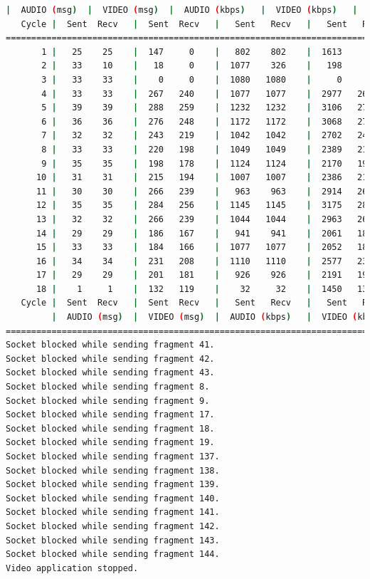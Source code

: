 \begin{lstlisting}[language=bash,basicstyle=\ttfamily\tiny]
         |  AUDIO (msg)  |  VIDEO (msg)  |  AUDIO (kbps)   |  VIDEO (kbps)   |     CPU (%) 
   Cycle |  Sent  Recv   |  Sent  Recv   |   Sent   Recv   |   Sent   Recv   | Program System
================================================================================================
       1 |   25    25    |  147     0    |   802    802    |  1613      0    |  22      0       
       2 |   33    10    |   18     0    |  1077    326    |   198      0    |  37     77       
       3 |   33    33    |    0     0    |  1080   1080    |     0      0    |  34     80       
       4 |   33    33    |  267   240    |  1077   1077    |  2977   2679    |  37     67       
       5 |   39    39    |  288   259    |  1232   1232    |  3106   2795    |  55     69       
       6 |   36    36    |  276   248    |  1172   1172    |  3068   2761    |  23     65
       7 |   32    32    |  243   219    |  1042   1042    |  2702   2432    |  30     69       
       8 |   33    33    |  220   198    |  1049   1049    |  2389   2150    |  35     58       
       9 |   35    35    |  198   178    |  1124   1124    |  2170   1953    |  46     67       
      10 |   31    31    |  215   194    |  1007   1007    |  2386   2147    |  26     69       
      11 |   30    30    |  266   239    |   963    963    |  2914   2623    |  35     71       
      12 |   35    35    |  284   256    |  1145   1145    |  3175   2858    |  37     80       
      13 |   32    32    |  266   239    |  1044   1044    |  2963   2667    |  31     74       
      14 |   29    29    |  186   167    |   941    941    |  2061   1855    |  30     78       
      15 |   33    33    |  184   166    |  1077   1077    |  2052   1847    |  37     80       
      16 |   34    34    |  231   208    |  1110   1110    |  2577   2319    |  26     77       
      17 |   29    29    |  201   181    |   926    926    |  2191   1972    |  22     73       
      18 |    1     1    |  132   119    |    32     32    |  1450   1305    |   4     60       
   Cycle |  Sent  Recv   |  Sent  Recv   |   Sent   Recv   |   Sent   Recv   | Program System
         |  AUDIO (msg)  |  VIDEO (msg)  |  AUDIO (kbps)   |  VIDEO (kbps)   |     CPU (%) 
===========================================================================================
Socket blocked while sending fragment 41.
Socket blocked while sending fragment 42.
Socket blocked while sending fragment 43.
Socket blocked while sending fragment 8.
Socket blocked while sending fragment 9.
Socket blocked while sending fragment 17.
Socket blocked while sending fragment 18.
Socket blocked while sending fragment 19.
Socket blocked while sending fragment 137.
Socket blocked while sending fragment 138.
Socket blocked while sending fragment 139.
Socket blocked while sending fragment 140.
Socket blocked while sending fragment 141.
Socket blocked while sending fragment 142.
Socket blocked while sending fragment 143.
Socket blocked while sending fragment 144.
Video application stopped.


\end{lstlisting}
